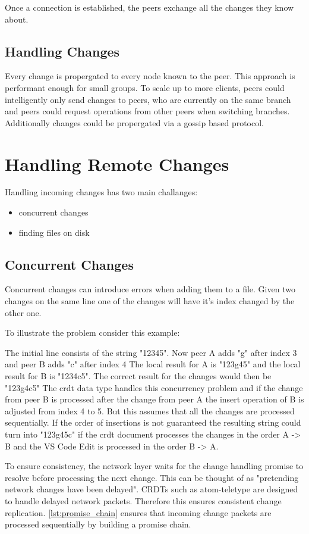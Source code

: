 Once a connection is established, the peers exchange all the changes they know about.

\subsection{Handling Changes}
Every change is propergated to every node known to the peer. This approach is performant enough for small groups. To scale up to more clients, peers could intelligently only send changes to peers, who are currently on the same branch and peers could request operations from other peers when switching branches. Additionally changes could be propergated via a gossip based protocol.

\section{Handling Remote Changes}

Handling incoming changes has two main challanges:
\begin{itemize}
    \item concurrent changes
    \item finding files on disk
\end{itemize}

\subsection{Concurrent Changes}
\label{subsec:concurrentchanges}
Concurrent changes can introduce errors when adding them to a file. 
Given two changes on the same line one of the changes will have it's index changed by the other one.

To illustrate the problem consider this example:

The initial line consists of the string "12345".
Now peer A adds "g" after index 3 and peer B adds "c" after index 4
The local result for A is "123g45" and the local result for B is "1234c5".
The correct result for the changes would then be "123g4c5"
The crdt data type handles this concurrency problem and if the change from peer B is processed after the change from peer A the insert operation of B is adjusted from index 4 to 5.
But this assumes that all the changes are processed sequentially. If the order of insertions is not guaranteed the resulting string could turn into "123g45c" if the crdt document processes the changes in the order A -> B and the VS Code Edit is processed in the order B -> A.

To ensure consistency, the network layer waits for the change handling promise to resolve before processing the next change. This can be thought of as "pretending network changes have been delayed".
CRDTs such as atom-teletype are designed to handle delayed network packets. Therefore this ensures consistent change replication. \ref{lst:promise_chain} ensures that incoming change packets are processed sequentially by building a promise chain.

